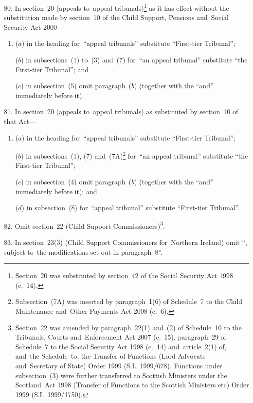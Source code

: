 \documentclass[12pt,a4paper]{article}
\begin{document}
\medskip

80.  In section~20 (appeals to~appeal tribunals)\footnote{Section~20 was substituted by section~42 of the Social Security Act 1998 (c.~14).} as it has effect without the substitution made by section~10 of the Child Support, Pensions and~Social Security Act 2000—
\begin{enumerate}\item[]
($a$) in the heading for~“appeal tribunals” substitute “First-tier Tribunal”;

($b$) in subsections~(1) to~(3) and~(7) for~“an appeal tribunal” substitute “the First-tier Tribunal”; and

($c$) in subsection~(5) omit paragraph~($b$)  (together with the “and” immediately before it).
\end{enumerate}

\medskip

81.  In section~20 (appeals to~appeal tribunals) as substituted by section~10 of that Act—
\begin{enumerate}\item[]
($a$) in the heading for~“appeal tribunals” substitute “First-tier Tribunal”;

($b$) in subsections~(1), (7) and~(7A)\footnote{Subsection~(7A) was inserted by paragraph~1(6) of Schedule~7 to the Child Maintenance and~Other Payments Act 2008 (c.~6).} for~“an appeal tribunal” substitute “the First-tier Tribunal”;

($c$) in subsection~(4) omit paragraph~($b$)  (together with the “and” immediately before it); and

($d$) in subsection~(8) for~“appeal tribunal” substitute “First-tier Tribunal”.
\end{enumerate}

\medskip

82.  Omit section~22 (Child Support Commissioners)\footnote{Section~22 was amended by paragraph~22(1) and~(2) of Schedule~10 to the Tribunals, Courts and~Enforcement Act 2007 (c.~15), paragraph~29 of Schedule~7 to the Social Security Act 1998 (c.~14) and~article~2(1) of, and~the Schedule~to, the Transfer of Functions (Lord Advocate and~Secretary of State) Order 1999 (S.I.~1999/678). Functions under subsection~(3) were further transferred to Scottish Ministers under the Scotland~Act 1998 (Transfer of Functions to the Scottish Ministers etc) Order 1999 (S.I.~1999/1750).}.

\medskip

83.  In section~23(3) (Child Support Commissioners for~Northern Ireland) omit “, subject to~the modifications set out in paragraph~8”.
\end{document}
